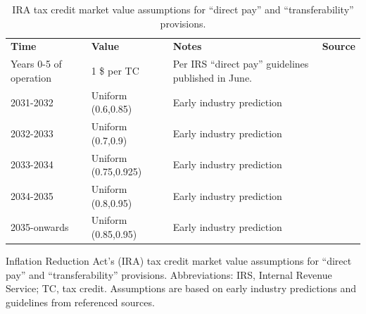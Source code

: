 \documentclass{article}
\begin{document}
\begin{table}[h]
  \centering
  \caption{IRA tax credit market value assumptions for “direct pay” and “transferability” provisions.}
  \label{tab:tax_credit_conversion} %
  \begin{threeparttable}
    \begin{tabularx}{\textwidth}{@{}p{3cm}p{3cm}Xp{4cm}@{}}
    \toprule
    \textbf{Time} & \textbf{Value} & \textbf{Notes} & \textbf{Source} \\ 
    Years 0-5 of operation & 1 \$ per TC & Per IRS “direct pay” guidelines published in June. & \cite{YOSEF2023, Chang2023} \\ 
    2031-2032 & Uniform (0.6,0.85) & Early industry prediction & \cite{McKenna2022, MARCUM2022} \\ 
    2032-2033 & Uniform (0.7,0.9) & Early industry prediction & \cite{McKenna2022, MARCUM2022} \\ 
    2033-2034 & Uniform (0.75,0.925) & Early industry prediction & \cite{McKenna2022, MARCUM2022} \\ 
    2034-2035 & Uniform (0.8,0.95) & Early industry prediction & \cite{McKenna2022, MARCUM2022} \\ 
    2035-onwards & Uniform (0.85,0.95) & Early industry prediction & \cite{McKenna2022, MARCUM2022} \\ \bottomrule
    \end{tabularx}
\begin{tablenotes}
  \footnotesize
  \item Inflation Reduction Act's (IRA) tax credit market value assumptions for “direct pay” and “transferability” provisions. Abbreviations: IRS, Internal Revenue Service; TC, tax credit. Assumptions are based on early industry predictions and guidelines from referenced sources.
\end{tablenotes}
  \end{threeparttable}
\end{table}
\end{document}
